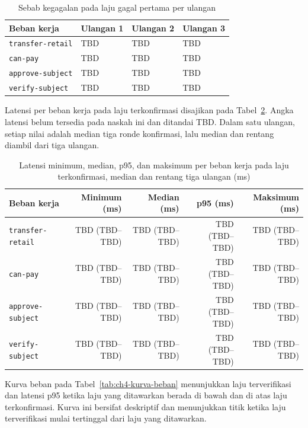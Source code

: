 \begin{table}[H]
\centering
\caption{Sebab kegagalan pada laju gagal pertama per ulangan}
\label{tab:ch4-sebab-gagal}
\scriptsize
\begin{tabular}{llll}
\toprule
Beban kerja & Ulangan 1 & Ulangan 2 & Ulangan 3 \\
\midrule
\texttt{transfer-retail} & TBD & TBD & TBD \\
\texttt{can-pay} & TBD & TBD & TBD \\
\texttt{approve-subject} & TBD & TBD & TBD \\
\texttt{verify-subject} & TBD & TBD & TBD \\
\bottomrule
\end{tabular}%
\end{table}

Latensi per beban kerja pada laju terkonfirmasi disajikan pada Tabel~\ref{tab:ch4-latensi-kinerja}. Angka latensi belum tersedia pada naskah ini dan ditandai TBD. Dalam satu ulangan, setiap nilai adalah median tiga ronde konfirmasi, lalu median dan rentang diambil dari tiga ulangan.

\begin{table}[H]
\centering
\caption{Latensi minimum, median, p95, dan maksimum per beban kerja pada laju terkonfirmasi, median dan rentang tiga ulangan (ms)}
\label{tab:ch4-latensi-kinerja}
\scriptsize
\begin{tabular}{lrrrr}
\toprule
Beban kerja & Minimum (ms) & Median (ms) & p95 (ms) & Maksimum (ms) \\
\midrule
\texttt{transfer-retail} & TBD (TBD--TBD) & TBD (TBD--TBD) & TBD (TBD--TBD) & TBD (TBD--TBD) \\
\texttt{can-pay} & TBD (TBD--TBD) & TBD (TBD--TBD) & TBD (TBD--TBD) & TBD (TBD--TBD) \\
\texttt{approve-subject} & TBD (TBD--TBD) & TBD (TBD--TBD) & TBD (TBD--TBD) & TBD (TBD--TBD) \\
\texttt{verify-subject} & TBD (TBD--TBD) & TBD (TBD--TBD) & TBD (TBD--TBD) & TBD (TBD--TBD) \\
\bottomrule
\end{tabular}%
\end{table}

Kurva beban pada Tabel~\ref{tab:ch4-kurva-beban} menunjukkan laju terverifikasi dan latensi p95 ketika laju yang ditawarkan berada di bawah dan di atas laju terkonfirmasi. Kurva ini bersifat deskriptif dan menunjukkan titik ketika laju terverifikasi mulai tertinggal dari laju yang ditawarkan.

